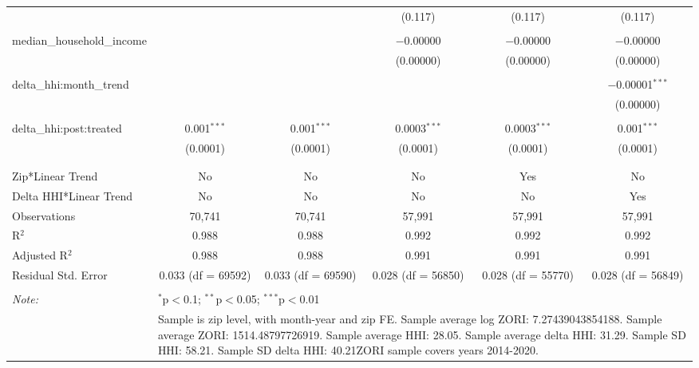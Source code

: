 \begin{table}[H]
{\begin{tabular}{@{\extracolsep{5pt}}lccccc}
   &  &  & (0.117) & (0.117) & (0.117) \\  

   & & & & & \\  

  median\_household\_income &  &  & $-$0.00000 & $-$0.00000 & $-$0.00000 \\  

   &  &  & (0.00000) & (0.00000) & (0.00000) \\  

   & & & & & \\  

  delta\_hhi:month\_trend &  &  &  &  & $-$0.00001$^{***}$ \\  

   &  &  &  &  & (0.00000) \\  

   & & & & & \\  

  delta\_hhi:post:treated & 0.001$^{***}$ & 0.001$^{***}$ & 0.0003$^{***}$ & 0.0003$^{***}$ & 0.001$^{***}$ \\  

   & (0.0001) & (0.0001) & (0.0001) & (0.0001) & (0.0001) \\  

   & & & & & \\  

 \hline \\[-1.8ex]  

 Zip*Linear Trend & No & No & No & Yes & No \\  

 Delta HHI*Linear Trend & No & No & No & No & Yes \\  

 Observations & 70,741 & 70,741 & 57,991 & 57,991 & 57,991 \\  

 R$^{2}$ & 0.988 & 0.988 & 0.992 & 0.992 & 0.992 \\  

 Adjusted R$^{2}$ & 0.988 & 0.988 & 0.991 & 0.991 & 0.991 \\  

 Residual Std. Error & 0.033 (df = 69592) & 0.033 (df = 69590) & 0.028 (df = 56850) & 0.028 (df = 55770) & 0.028 (df = 56849) \\  

 \hline  

 \hline \\[-1.8ex]  

 \textit{Note:}  & \multicolumn{5}{l}{$^{*}$p$<$0.1; $^{**}$p$<$0.05; $^{***}$p$<$0.01} \\  

  & \multicolumn{5}{l}{Sample is zip level, with month-year and zip FE. Sample average log ZORI: 7.27439043854188. Sample average ZORI: 1514.48797726919. Sample average HHI: 28.05. Sample average delta HHI: 31.29. Sample SD HHI: 58.21. Sample SD delta HHI: 40.21ZORI sample covers years 2014-2020.} \\  

 \end{tabular}}  

 \end{table}  

